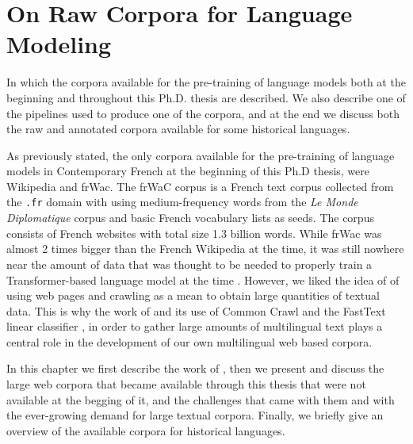 \chapter{On Raw Corpora for Language Modeling}

\begin{center}
    \begin{minipage}{0.66\textwidth}
        \begin{small}
            In which the corpora available for the pre-training of language models both at the beginning and throughout this Ph.D. thesis are described. We also describe one of the pipelines used to produce one of the corpora, and at the end we discuss both the raw and annotated corpora available for some historical languages.
        \end{small}
    \end{minipage}
    \vspace{0.5cm}
\end{center}

As previously stated, the only corpora available for the pre-training of language models in Contemporary French at the beginning of this Ph.D thesis, were Wikipedia and frWac. The frWaC corpus \citep{baroni-etal-2009-the} is a French text corpus collected from the \texttt{.fr} domain with using medium-frequency words from the \emph{Le Monde Diplomatique} corpus and basic French vocabulary lists as seeds. The corpus consists of French websites with total size 1.3 billion words. While frWac was almost 2 times bigger than the French Wikipedia at the time, it was still nowhere near the amount of data that was thought to be needed to properly train a Transformer-based language model at the time \citep{liu-etal-2019-roberta}. However, we liked the idea of \citet{baroni-etal-2009-the} of using web pages and crawling as a mean to obtain large quantities of textual data. This is why the work of \citet{mikolov-etal-2018-advances} and its use of Common Crawl and the FastText linear classifier \citep{joulin-etal-2016-fasttext, joulin-etal-2017-bag}, in order to gather large amounts of multilingual text plays a central role in the development of our own multilingual web based corpora.

In this chapter we first describe the work of \citet{mikolov-etal-2018-advances}, then we present and discuss the large web corpora that became available through this thesis that were not available at the begging of it, and the challenges that came with them and with the ever-growing demand for large textual corpora. Finally, we briefly give an overview of the available corpora for historical languages.

